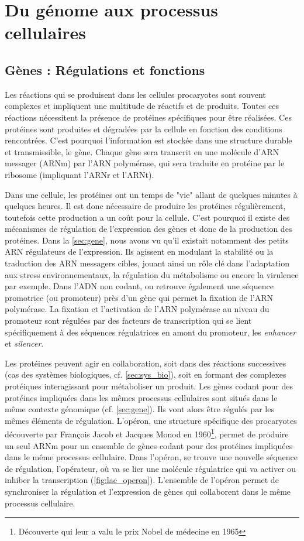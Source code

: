 \newpage
\section{Du génome aux processus cellulaires}

\subsection{Gènes : Régulations et fonctions}
\label{sec:fn_reg}

Les réactions qui se produisent dans les cellules procaryotes sont souvent complexes et impliquent une multitude de réactifs et de produits. Toutes ces réactions nécessitent la présence de protéines spécifiques pour être réalisées. Ces protéines sont produites et dégradées par la cellule en fonction des conditions rencontrées. C'est pourquoi l'information est stockée dans une structure durable et transmissible, le gène. Chaque gène sera transcrit en une molécule d'ARN messager (ARNm) par l'ARN polymérase, qui sera traduite en protéine par le ribosome (impliquant l'ARNr et l'ARNt). 


Dans une cellule, les protéines ont un temps de "vie" allant de quelques minutes à quelques heures. Il est donc nécessaire de produire les protéines régulièrement, toutefois cette production a un coût pour la cellule. C'est pourquoi il existe des mécanismes de régulation de l'expression des gènes et donc de la production des protéines. Dans la \autoref{sec:gene}, nous avons vu qu'il existait notamment des petits ARN régulateurs de l'expression. Ils agissent en modulant la stabilité ou la traduction des ARN messagers cibles, jouant ainsi un rôle clé dans l’adaptation aux stress environnementaux, la régulation du métabolisme ou encore la virulence par exemple. Dans l'ADN non codant, on retrouve également une séquence promotrice (ou promoteur) près d'un gène qui permet la fixation de l'ARN polymérase. La fixation et l'activation de l'ARN polymérase au niveau du promoteur sont régulées par des facteurs de transcription qui se lient spécifiquement à des séquences régulatrices en amont du promoteur, les \textit{enhancer} et \textit{silencer}.


Les protéines peuvent agir en collaboration, soit dans des réactions successives (cas des systèmes biologiques, cf. \autoref{sec:sys_bio}), soit en formant des complexes protéiques interagissant pour métaboliser un produit. Les gènes codant pour des protéines impliquées dans les mêmes processus cellulaires sont situés dans le même contexte génomique (cf. \autoref{sec:gene}). Ils vont alors être régulés par les mêmes éléments de régulation. L'opéron, une structure spécifique des procaryotes découverte par François Jacob et Jacques Monod en 1960\footnote{Découverte qui leur a valu le prix Nobel de médecine en 1965}\cite{jacob_genetic_1961}, permet de produire un seul ARNm pour un ensemble de gènes codant pour des protéines impliquées dans le même processus cellulaire. Dans l'opéron, se trouve une nouvelle séquence de régulation, l'opérateur, où va se lier une molécule régulatrice qui va activer ou inhiber la transcription (\autoref{fig:lac_operon}). L'ensemble de l'opéron permet de synchroniser la régulation et l'expression de gènes qui collaborent dans le même processus cellulaire.


